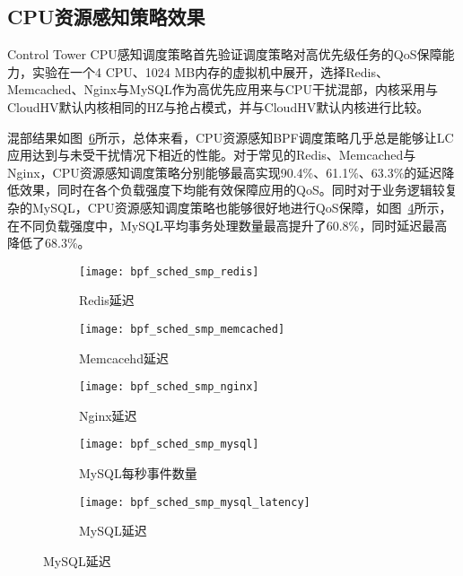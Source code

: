 \subsection{CPU资源感知策略效果}


Control Tower CPU感知调度策略首先验证调度策略对高优先级任务的QoS保障能力，实验在一个4 CPU、1024 MB内存的虚拟机中展开，选择Redis、Memcached、Nginx与MySQL作为高优先应用来与CPU干扰混部，内核采用与CloudHV默认内核相同的HZ与抢占模式，并与CloudHV默认内核进行比较。

混部结果如图~\ref{fig:lc_bpf_sched}所示，总体来看，CPU资源感知BPF调度策略几乎总是能够让LC应用达到与未受干扰情况下相近的性能。对于常见的Redis、Memcached与Nginx，CPU资源感知调度策略分别能够最高实现90.4\%、61.1\%、63.3\%的延迟降低效果，同时在各个负载强度下均能有效保障应用的QoS。同时对于业务逻辑较复杂的MySQL，CPU资源感知调度策略也能够很好地进行QoS保障，如图~\ref{fig:bpf_sched_smp_mysql}所示，在不同负载强度中，MySQL平均事务处理数量最高提升了60.8\%，同时延迟最高降低了68.3\%。

\begin{figure}[H]
    \centering
    \begin{subfigure}[b]{0.32\textwidth}
        \texttt{[image: bpf\_sched\_smp\_redis]}
        \caption{\quad Redis延迟}
        \label{fig:bpf_sched_smp_memcached}
    \end{subfigure}
    \begin{subfigure}[b]{0.32\textwidth}
        \texttt{[image: bpf\_sched\_smp\_memcached]}
        \caption{\quad Memcacehd延迟}
        \label{fig:bpf_sched_smp_memcached}
    \end{subfigure}
    \begin{subfigure}[b]{0.32\textwidth}
        \texttt{[image: bpf\_sched\_smp\_nginx]}
        \caption{\quad Nginx延迟}
        \label{fig:bpf_sched_smp_memcached}
    \end{subfigure}
    \begin{subfigure}[b]{0.32\textwidth}
        \texttt{[image: bpf\_sched\_smp\_mysql]}
        \caption{\quad MySQL每秒事件数量}
        \label{fig:bpf_sched_smp_mysql}
    \end{subfigure}
    \begin{subfigure}[b]{0.32\textwidth}
        \texttt{[image: bpf\_sched\_smp\_mysql\_latency]}
        \caption{\quad MySQL延迟} 
        \label{fig:bpf_sched_smp_mysql_latency}
    \end{subfigure}

\label{fig:lc_bpf_sched}
\end{figure}

